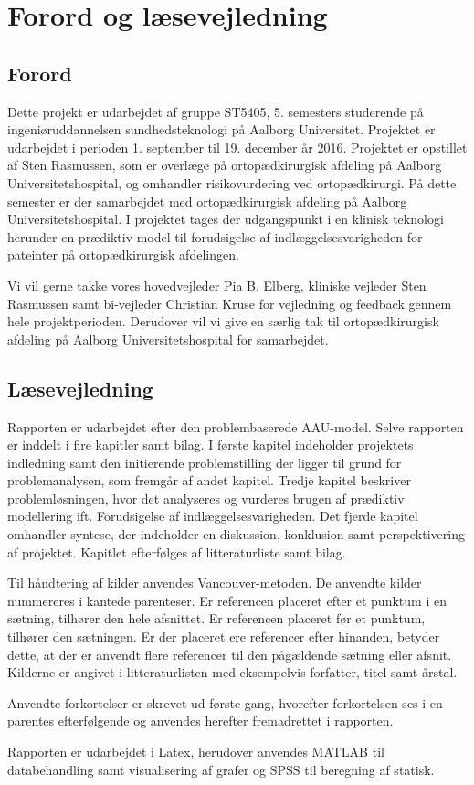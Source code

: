 \chapter*{Forord og læsevejledning}

\section{Forord}
Dette projekt er udarbejdet af gruppe ST5405, 5. semesters studerende på ingeniøruddannelsen sundhedsteknologi på Aalborg Universitet. Projektet er udarbejdet i perioden 1. september til 19. december år 2016. Projektet er opstillet af Sten Rasmussen, som er overlæge på ortopædkirurgisk afdeling på Aalborg Universitetshospital, og omhandler risikovurdering ved ortopædkirurgi. På dette semester er der samarbejdet med ortopædkirurgisk afdeling på Aalborg Universitetshospital. I projektet tages der udgangspunkt i en klinisk teknologi herunder en prædiktiv model til forudsigelse af indlæggelsesvarigheden for pateinter på ortopædkirurgisk afdelingen. 


Vi vil gerne takke vores hovedvejleder Pia B. Elberg, kliniske vejleder Sten Rasmussen samt bi-vejleder Christian Kruse for vejledning og feedback gennem hele projektperioden. Derudover vil vi give en særlig tak til ortopædkirurgisk afdeling på Aalborg Universitetshospital for samarbejdet. 


\section*{Læsevejledning}
Rapporten er udarbejdet efter den problembaserede AAU-model. Selve rapporten er inddelt i fire kapitler samt bilag. I første kapitel indeholder projektets indledning samt den initierende problemstilling der ligger til grund for problemanalysen, som fremgår af andet kapitel. Tredje kapitel beskriver problemløsningen, hvor det analyseres og vurderes brugen af prædiktiv modellering ift. Forudsigelse af indlæggelsesvarigheden. Det fjerde kapitel omhandler syntese, der indeholder en diskussion, konklusion samt perspektivering af projektet. Kapitlet efterfølges af litteraturliste samt bilag. 


Til håndtering af kilder anvendes Vancouver-metoden. De anvendte kilder nummereres i kantede parenteser. Er referencen placeret efter et punktum i en sætning, tilhører den hele afsnittet. Er referencen placeret før et punktum, tilhører den sætningen. Er der placeret ere referencer efter hinanden, betyder dette, at der er anvendt flere referencer til den pågældende sætning eller afsnit. Kilderne er angivet i litteraturlisten med eksempelvis forfatter, titel samt årstal. 


Anvendte forkortelser er skrevet ud første gang, hvorefter forkortelsen ses i en parentes efterfølgende og anvendes herefter fremadrettet i rapporten. 


Rapporten er udarbejdet i Latex, herudover anvendes MATLAB til databehandling samt visualisering af grafer og SPSS til beregning af statisk. 
